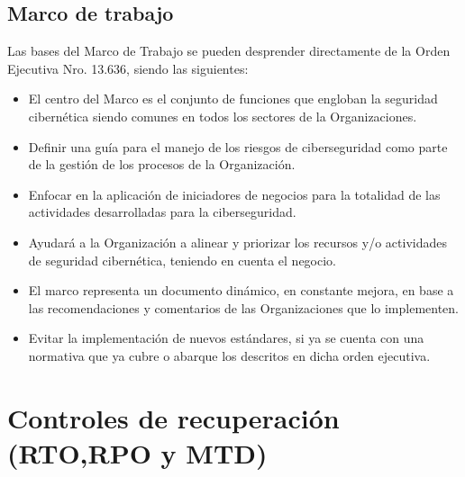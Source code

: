 \documentclass[conference]{IEEEtran}
\begin{document}
\subsection{Marco de trabajo}
Las bases del Marco de Trabajo se pueden desprender directamente
de la Orden Ejecutiva Nro. 13.636, siendo las siguientes:
\begin{itemize}
    \item El centro del Marco es el conjunto de funciones que engloban la
seguridad cibernética siendo comunes en todos los sectores de la
Organizaciones.
\item Definir una guía para el manejo de los riesgos de ciberseguridad
como parte de la gestión de los procesos de la Organización.
\item Enfocar en la aplicación de iniciadores de negocios para la totalidad
de las actividades desarrolladas para la ciberseguridad.
\item Ayudará a la Organización a alinear y priorizar los recursos y/o
actividades de seguridad cibernética, teniendo en cuenta el negocio.
\item El marco representa un documento dinámico, en constante mejora, en
base a las recomendaciones y comentarios de las Organizaciones
que lo implementen.
\item Evitar la implementación de nuevos estándares, si ya se cuenta con
una normativa que ya cubre o abarque los descritos en dicha orden
ejecutiva.
\end{itemize}

\section{Controles de recuperación (RTO,RPO y MTD)}
\end{document}
